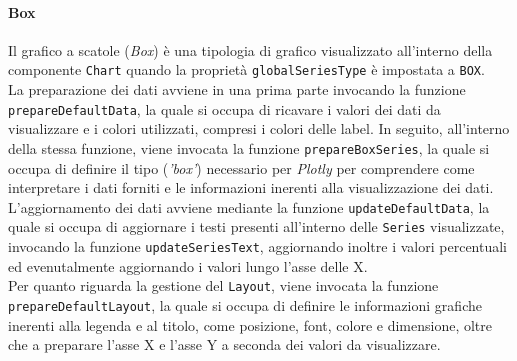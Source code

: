 \paragraph{Box}
Il grafico a scatole (\textit{Box}) è una tipologia di grafico visualizzato all'interno della componente \texttt{Chart} quando la proprietà \texttt{globalSeriesType} è impostata a \texttt{BOX}. \\
La preparazione dei dati avviene in una prima parte invocando la funzione \texttt{prepareDefaultData}, la quale si occupa di ricavare i valori dei dati da visualizzare e i colori utilizzati, compresi i
colori delle label. In seguito, all'interno della stessa funzione, viene invocata la funzione \texttt{prepareBoxSeries}, la quale si occupa di definire il tipo (\textit{'box'}) necessario per \textit{Plotly} per comprendere
come interpretare i dati forniti e le informazioni inerenti alla visualizzazione dei dati. \\
L'aggiornamento dei dati avviene mediante la funzione \texttt{updateDefaultData}, la quale si occupa di aggiornare i testi presenti all'interno delle \texttt{Series} visualizzate, invocando la funzione
\texttt{updateSeriesText}, aggiornando inoltre i valori percentuali ed evenutalmente aggiornando i valori lungo l'asse delle X. \\
Per quanto riguarda la gestione del \texttt{Layout}, viene invocata la funzione \texttt{prepareDefaultLayout}, la quale si occupa di definire le informazioni grafiche inerenti alla legenda e al titolo, come posizione,
font, colore e dimensione, oltre che a preparare l'asse X e l'asse Y a seconda dei valori da visualizzare.

